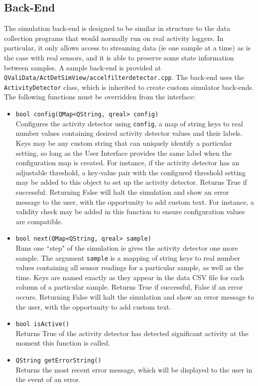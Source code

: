 \documentclass[]{article}
\begin{document}
	\subsection{Back-End}
		The simulation back-end is designed to be similar in structure to the data collection programs that would normally run on real activity loggers. In particular, it only allows access to streaming data (ie one sample at a time) as is the case with real sensors, and it is able to preserve some state information between samples. A sample back-end is provided at \texttt{QValiData/ActDetSimView/accelfilterdetector.cpp}. The back-end uses the \texttt{ActivityDetector} class, which is inherited to create custom simulator back-ends. The following functions must be overridden from the interface:
		\begin{itemize}
			\item \texttt{bool config(QMap<QString, qreal> config)}\\
			Configures the activity detector using \texttt{config}, a map of string keys to real number values containing desired activity detector values and their labels. Keys may be any custom string that can uniquely identify a particular setting, so long as the User Interface provides the same label when the configuration map is created. For instance, if the activity detector has an adjustable threshold, a key-value pair with the configured threshold setting may be added to this object to set up the activity detector. Returns True if successful. Returning False will halt the simulation and show an error message to the user, with the opportunity to add custom text. For instance, a validity check may be added in this function to ensure configuration values are compatible. 
			
			\item \texttt{bool next(QMap<QString, qreal> sample)}\\
			Runs one ``step" of the simulation ie gives the activity detector one more sample. The argument \texttt{sample} is a mapping of string keys to real number values containing all sensor readings for a particular sample, as well as the time. Keys are named exactly as they appear in the data CSV file for each column of a particular sample. Returns True if successful, False if an error occurs. Returning False will halt the simulation and show an error message to the user, with the opportunity to add custom text.
			
			\item \texttt{bool isActive()}\\
			Returns True of the activity detector has detected significant activity at the moment this function is called.
			
			\item \texttt{QString getErrorString()}\\
			Returns the most recent error message, which will be displayed to the user in the event of an error. 
		\end{itemize}
\end{document}
